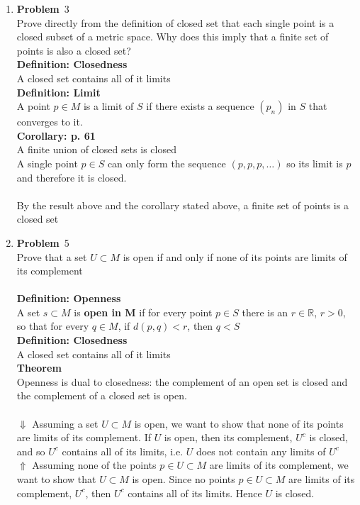 \documentclass[12pt]{amsart}
\theoremstyle{definition}
\newcommand{\mbR}{\mathbb{R}}
\newcommand{\itep}{\item {\bfseries Problem}\ }
\begin{document}
\begin{enumerate}[series=p]
\itep 3\\
Prove directly from the definition of closed set that each single point is a closed subset of a metric space.  Why does this imply that a finite set of points is also a closed set?
\\
\textbf{Definition: Closedness}\\
A closed set contains all of it limits\\
\textbf{Definition: Limit}\\
A point $p \in M$ is a limit of $S$ if there exists a sequence $(p_n)$ in $S$ that converges to it.\\
\textbf{Corollary: p. 61}\\
A finite union of closed sets is closed
\\
A single point $p \in S$ can only form the sequence $(p, p, p, \dots)$ so its limit is $p$ and therefore it is closed.\\
\\
By the result above and the corollary stated above, a finite set of points is a closed set
\newpage


\itep 5\\
Prove that a set $U \subset M$ is open if and only if none of its points are limits of its complement
\\\\
\textbf{Definition: Openness}\\
A set $s \subset M$ is \textbf{open in M} if for every point $p \in S$ there is an $r \in \mbR$, $r>0$, so that for every $q \in M$,
if $d(p,q) < r$, then $q < S$
\\
\textbf{Definition: Closedness}\\
A closed set contains all of it limits\\
\textbf{Theorem}\\
Openness is dual to closedness:  the complement of an open set is closed and the complement of a closed set is open.\\
\\
$\Downarrow$ Assuming a set $U \subset M$ is open, we want to show that none of its points are limits of its complement.  If $U$ is open, then its complement, $U^c$ is closed, and so $U^c$ contains all of its limits, i.e. $U$ does not contain any limits of $U^c$\\
$\Uparrow$ Assuming none of the points $p \in U \subset M$ are limits of its complement, we want to show that $U \subset M$ is open.  Since no points $p \in U \subset M$ are limits of its complement, $U^c$, then $U^c$ contains all of its limits.  Hence $U$ is closed.
\newpage


\end{enumerate}
\end{document}
